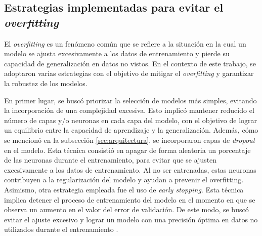 \subsection{Estrategias implementadas para evitar el \emph{overfitting}}
El \emph{overfitting} es un fenómeno común que se refiere a la situación en la cual un modelo 
se ajusta excesivamente a los datos de entrenamiento y pierde su capacidad de generalización 
en datos no vistos. En el contexto de este trabajo, se adoptaron varias estrategias 
con el objetivo de mitigar el \emph{overfitting} y garantizar la robustez de los modelos.

En primer lugar, se buscó priorizar la selección 
de modelos más simples, evitando la incorporación de una complejidad excesiva. Esto implicó 
mantener reducido el número de capas y/o neuronas en cada capa del modelo, con el objetivo de 
lograr un equilibrio entre la capacidad de aprendizaje y la generalización.
Además, cómo se mencionó en la subsección \ref{sec:arquitectura}, se incorporaron capas 
de \emph{dropout} en el modelo. Esta técnica consistió en apagar de forma aleatoria un 
porcentaje de las neuronas durante el entrenamiento, para evitar que se ajusten excesivamente 
a los datos de entrenamiento. Al no ser entrenadas, estas neuronas contribuyen a la 
regularización del modelo y ayudan a prevenir el overfitting.
Asimismo, otra estrategia empleada fue el uso de \emph{early stopping}. Esta técnica implica detener 
el proceso de entrenamiento del modelo en el momento en que se observa un aumento en el valor 
del error de validación. De este modo, se buscó evitar el ajuste excesivo y lograr un modelo 
con una precisión óptima en datos no utilizados durante el entrenamiento \citep{CITE:44}.
